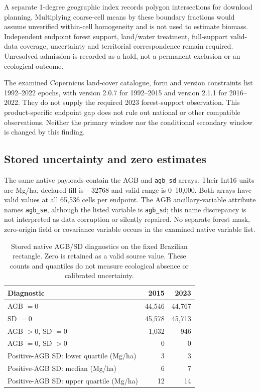 \documentclass[11pt,a4paper]{article}
\begin{document}


A separate 1-degree geographic index records polygon intersections for download planning. Multiplying coarse-cell means by these boundary fractions would assume unverified within-cell homogeneity and is not used to estimate biomass. Independent endpoint forest support, land/water treatment, full-support valid-data coverage, uncertainty and territorial correspondence remain required. Unresolved admission is recorded as a hold, not a permanent exclusion or an ecological outcome.

The examined Copernicus land-cover catalogue, form and version constraints list 1992--2022 epochs, with version 2.0.7 for 1992--2015 and version 2.1.1 for 2016--2022. They do not supply the required 2023 forest-support observation. This product-specific endpoint gap does not rule out national or other compatible observations. Neither the primary window nor the conditional secondary window is changed by this finding.

\subsection{Stored uncertainty and zero estimates}

The same native payloads contain the AGB and \texttt{agb\_sd} arrays. Their Int16 units are Mg/ha, declared fill is $-32768$ and valid range is 0--10,000. Both arrays have valid values at all 65,536 cells per endpoint. The AGB ancillary-variable attribute names \texttt{agb\_se}, although the listed variable is \texttt{agb\_sd}; this name discrepancy is not interpreted as data corruption or silently repaired. No separate forest mask, zero-origin field or covariance variable occurs in the examined native variable list.

\begin{table}[htbp]
\centering\small
\caption{Stored native AGB/SD diagnostics on the fixed Brazilian rectangle. Zero is retained as a valid source value. These counts and quantiles do not measure ecological absence or calibrated uncertainty.}\label{tab:native_sd}
\begin{tabular}{lrr}
\toprule
Diagnostic & 2015 & 2023\\\midrule
AGB $=0$ & 44,546 & 44,767\\
SD $=0$ & 45,578 & 45,713\\
AGB $>0$, SD $=0$ & 1,032 & 946\\
AGB $=0$, SD $>0$ & 0 & 0\\
Positive-AGB SD: lower quartile (Mg/ha) & 3 & 3\\
Positive-AGB SD: median (Mg/ha) & 6 & 7\\
Positive-AGB SD: upper quartile (Mg/ha) & 12 & 14\\\bottomrule
\end{tabular}
\end{table}
\end{document}
